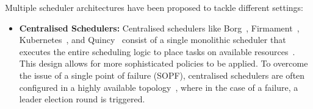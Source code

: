 Multiple scheduler architectures have been proposed to tackle different
settings:
\begin{itemize}
    \item \textbf{Centralised Schedulers:} Centralised schedulers like
        Borg~\cite{verma2015large}, Firmament~\cite{gog_firmament_2016}, Kubernetes~\cite{ungureanu2019kubernetes}, and Quincy~\cite{isard2009quincy}
        consist of a single monolithic scheduler that executes the entire
        scheduling logic to place tasks on available resources~\cite{schwarzkopf2016evolution}. This
        design allows for more sophisticated policies to be applied. To overcome the
        issue of a single point of failure (SOPF), centralised schedulers are
        often configured in a highly available topology~\cite{boutin2014apollo, ungureanu2019kubernetes, verma2015large},
        where in the case of a failure, a leader election round is triggered.


\end{itemize}
